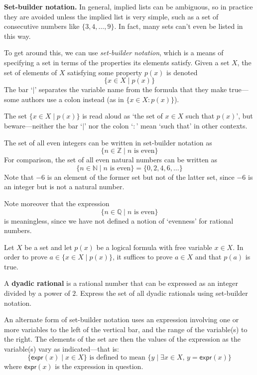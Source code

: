 \textbf{Set-builder notation.}
In general, implied lists can be ambiguous, so in practice they are avoided unless the implied list is very simple, such as a set of consecutive numbers like $\{3, 4, \dots, 9 \}$. In fact, many sets can't even be listed in this way.

To get around this, we can use \textit{set-builder notation}, which is a means of specifying a set in terms of the properties its elements satisfy. Given a set $X$, the set of elements of $X$ satisfying some property $p(x)$ is denoted
\[ \{ x \in X \mid p(x) \} \]
The bar `$\mid$'  separates the variable name from the formula that they make true---some authors use a colon instead (as in $\{ x \in X : p(x) \}$).

The set $\{ x \in X \mid p(x) \}$ is read aloud as `the set of $x \in X$ such that $p(x)$', but beware---neither the bar `$\mid$' nor the colon `$:$' mean `such that' in other contexts.

\begin{example}
\label{exSetsSpecifyUniverses}
The set of all even integers can be written in set-builder notation as
\[ \{ n \in \mathbb{Z} \mid n \text{ is even} \} \]
For comparison, the set of all even natural numbers can be written as
\[ \{ n \in \mathbb{N} \mid n \text{ is even} \} = \{ 0, 2, 4, 6, \dots \} \]
Note that $-6$ is an element of the former set but not of the latter set, since $-6$ is an integer but is not a natural number.

Note moreover that the expression
\[ \{ n \in \mathbb{Q} \mid n \text{ is even} \} \]
is meaningless, since we have not defined a notion of `evenness' for rational numbers.
\end{example}

\begin{strategy}
Let $X$ be a set and let $p(x)$ be a logical formula with free variable $x \in X$. In order to prove $a \in \{ x \in X \mid p(x) \}$, it suffices to prove $a \in X$ and that $p(a)$ is true.
\end{strategy}

\begin{exercise}
\label{exDyadicRatioal}
A \textbf{dyadic rational} is a rational number that can be expressed as an integer divided by a power of $2$. Express the set of all dyadic rationals using set-builder notation.
\end{exercise}

An alternate form of set-builder notation uses an expression involving one or more variables to the left of the vertical bar, and the range of the variable(s) to the right. The elements of the set are then the values of the expression as the variable(s) vary as indicated---that is:
\[ \{ \mathsf{expr}(x) \mid x \in X \} \text{ is defined to mean } \{ y \mid \exists x \in X,\, y = \mathsf{expr}(x) \} \]
where $\mathsf{expr}(x)$ is the expression in question.

